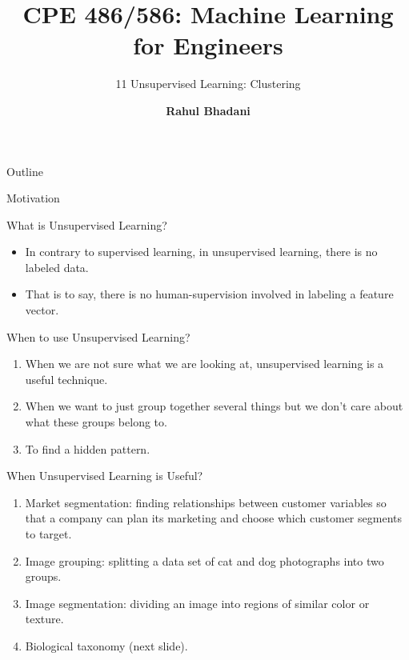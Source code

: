 \documentclass[aspectratio=169,xcolor=dvipsnames,svgnames,x11names,fleqn]{beamer}
\title[CPE 486/586: Machine Learning]{CPE 486/586: Machine Learning for Engineers} %
\subtitle{11 Unsupervised Learning: Clustering}
\author[Rahul Bhadani] {{\Large \textbf{Rahul Bhadani}}}
\institute[UAH] %
{
    Electrical \& Computer Engineering,  The University of Alabama in Huntsville
}
\date
\begin{document}
\begin{frame}
    \titlepage
\end{frame}

\begin{frame}{Outline}
    \backgroundtableofcontents
\end{frame}





\begin{sectionframe}{\faLightbulb}{Motivation}
\end{sectionframe}

\begin{frame}{What is Unsupervised Learning?}
    \begin{itemize}
    \item In contrary to supervised learning, in unsupervised learning, there is no labeled data.
    \item That is to say, there is no human-supervision involved in labeling a feature vector.
\end{itemize}
\end{frame}

\begin{frame}{When to use Unsupervised Learning?}
\begin{enumerate}
    \item When we are not sure what we are looking at, unsupervised learning is a useful technique.
    \item When we want to just group together several things but we don't care about what these groups belong to.
    \item To find a hidden pattern.
\end{enumerate}
\end{frame}

\begin{frame}{When Unsupervised Learning is Useful?}
    \begin{enumerate}
\item Market segmentation: finding relationships between customer variables so that a company can plan its marketing and choose which customer segments to target.
\item Image grouping: splitting a data set of cat and dog photographs into two groups.
\item Image segmentation: dividing an image into regions of similar color or texture.
\item Biological taxonomy (next slide).
    \end{enumerate}
    \end{frame}
\end{document}
